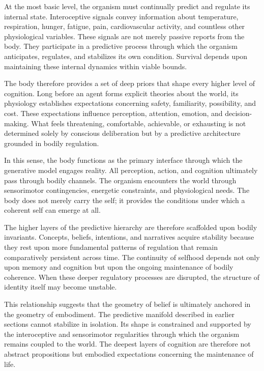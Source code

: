 \documentclass[12pt,letterpaper]{article}
\theoremstyle{remark}
\begin{document}
At the most basic level, the organism must continually predict and regulate its internal state. Interoceptive signals convey information about temperature, respiration, hunger, fatigue, pain, cardiovascular activity, and countless other physiological variables. These signals are not merely passive reports from the body. They participate in a predictive process through which the organism anticipates, regulates, and stabilizes its own condition. Survival depends upon maintaining these internal dynamics within viable bounds.

The body therefore provides a set of deep priors that shape every higher level of cognition. Long before an agent forms explicit theories about the world, its physiology establishes expectations concerning safety, familiarity, possibility, and cost. These expectations influence perception, attention, emotion, and decision-making. What feels threatening, comfortable, achievable, or exhausting is not determined solely by conscious deliberation but by a predictive architecture grounded in bodily regulation.

In this sense, the body functions as the primary interface through which the generative model engages reality. All perception, action, and cognition ultimately pass through bodily channels. The organism encounters the world through sensorimotor contingencies, energetic constraints, and physiological needs. The body does not merely carry the self; it provides the conditions under which a coherent self can emerge at all.

The higher layers of the predictive hierarchy are therefore scaffolded upon bodily invariants. Concepts, beliefs, intentions, and narratives acquire stability because they rest upon more fundamental patterns of regulation that remain comparatively persistent across time. The continuity of selfhood depends not only upon memory and cognition but upon the ongoing maintenance of bodily coherence. When these deeper regulatory processes are disrupted, the structure of identity itself may become unstable.

This relationship suggests that the geometry of belief is ultimately anchored in the geometry of embodiment. The predictive manifold described in earlier sections cannot stabilize in isolation. Its shape is constrained and supported by the interoceptive and sensorimotor regularities through which the organism remains coupled to the world. The deepest layers of cognition are therefore not abstract propositions but embodied expectations concerning the maintenance of life.
\end{document}
